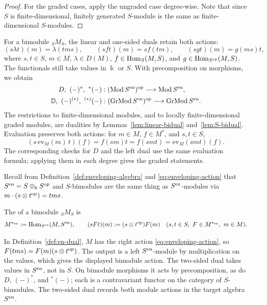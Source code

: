 \begin{advanced}[suppressfirstparskip=true,innertopmargin=0pt]
\begin{proof}
For the graded cases, apply the ungraded case degree-wise.  Note that since $S$ is finite-dimensional, finitely generated $S$-module is the same as finite-dimensional $S$-modules.
\end{proof}

For a bimodule ${}_SM_S$, the linear and one-sided duals retain both actions:
\begin{equation}\label{eq:bimodule-dual-actions}
(s\lambda t)(m)=\lambda(tms),\qquad
(sft)(m)=sf(tm),\qquad
(sgt)(m)=g(ms)t,
\end{equation}
where $s,t\in S$, $m\in M$, $\lambda\in D(M)$, $f\in\operatorname{Hom}\nolimits_S(M,S)$, and $g\in\operatorname{Hom}\nolimits_{S^{\mathrm{op}}}(M,S)$.
The functionals still take values in $\Bbbk$ or $S$.
With precomposition on morphisms, we obtain
\begin{equation}\label{eq:one-sided-bimodule-dual-functors}
\begin{aligned}
D,\ (-)^*,\ {}^*(-)&:(\operatorname{\mathrm{Mod}} S^{\mathrm{en}})^{\mathrm{op}}\longrightarrow\operatorname{\mathrm{Mod}} S^{\mathrm{en}},\\
\mathbb{D},\ (-)^{(*)},\ {}^{(*)}(-)&:(\operatorname{\mathrm{GrMod}} S^{\mathrm{en}})^{\mathrm{op}}\longrightarrow\operatorname{\mathrm{GrMod}} S^{\mathrm{en}}.
\end{aligned}
\end{equation}
The restrictions to finite-dimensional modules, and to locally finite-dimensional graded modules, are dualities by Lemmas~\ref{lem:linear-bidual} and~\ref{lem:S-bidual}.
Evaluation preserves both actions: for $m\in M$, $f\in M^*$, and $s,t\in S$,
\[
(s\,\mathrm{ev}_M(m)\,t)(f)
=f(sm)t=f(smt)=\mathrm{ev}_M(smt)(f).
\]
The corresponding checks for $D$ and the left dual use the same evaluation formula; applying them in each degree gives the graded statements.

Recall from Definition~\ref{def:enveloping-algebra} and \eqref{eq:enveloping-action} that
$S^{\mathrm{en}}=S\otimes_\Bbbk S^{\mathrm{op}}$ and $S$-bimodules are the same thing as $S^{\mathrm{en}}$-modules via $m\cdot(s\otimes t^{\mathrm{op}})=tms$.

\begin{definition}\label{def:en-dual}
The  of a bimodule ${}_SM_S$ is
\[
M^{*_{\mathrm{en}}}:=\operatorname{Hom}\nolimits_{S^{\mathrm{en}}}(M,S^{\mathrm{en}}),
\qquad (sFt)(m):=(s\otimes t^{\mathrm{op}})F(m)
\quad(s,t\in S,\ F\in M^{*_{\mathrm{en}}},\ m\in M).
\]
\end{definition}

In Definition~\ref{def:en-dual}, $M$ has the right action \eqref{eq:enveloping-action}, so $F(tms)=F(m)(s\otimes t^{\mathrm{op}})$.
The output is a left $S^{\mathrm{en}}$-module by multiplication on the values, which gives the displayed bimodule action.
The two-sided dual takes values in $S^{\mathrm{en}}$, not in $S$.
On bimodule morphisms it acts by precomposition, as do $D$, $(-)^*$, and ${}^*(-)$; each is a contravariant functor on the category of $S$-bimodules.
The two-sided dual records both module actions in the target algebra $S^{\mathrm{en}}$.


\end{advanced}
